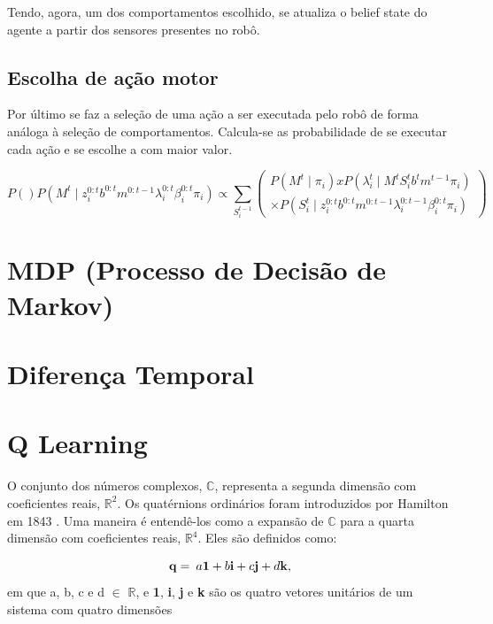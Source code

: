 Tendo, agora, um dos comportamentos escolhido, se atualiza o belief state do agente a partir dos sensores presentes no robô.



\subsection{Escolha de ação motor}

Por último se faz a seleção de uma ação a ser executada pelo robô de forma análoga à seleção de comportamentos. Calcula-se as probabilidade de se executar cada ação  e se escolhe a com maior valor.

\begin{equation}
    P \left( \right)
    P \left( M^t \mid z_i^{0: t} b^{0: t} m^{0: t-1} \lambda_i^{0: t} \beta_i^{0: t} \pi_i \right) \propto \sum\limits_{S_i^{t-1}}
        \left(
            \begin{array}{l}
                P \left( M^t \mid \pi_i \right) x   P \left( \lambda_i^t \mid M^t S_i^t b^t m^{t-1} \pi_i \right)\\
                \times P \left( S_i^t \mid z_i^{0: t} b^{0: t} m^{0: t-1} \lambda_i^{0: t-1} \beta_i^{0: t} \pi_i \right)
            \end{array}
        \right)
\end{equation}


\section{MDP (Processo de Decisão de Markov)}

\section{Diferença Temporal}

\section{Q Learning}

O conjunto dos números complexos, $\mathbb{C}$, representa a segunda
dimensão com coeficientes reais, $\mathbb{R}^{2}$. Os quatérnions
ordinários foram introduzidos por Hamilton em 1843 \cite{book:hamilton:1969}.
Uma maneira é entendê-los como a expansão de $\mathbb{C}$ para a
quarta dimensão com coeficientes reais, $\mathbb{R}^{4}$. Eles são
definidos como:

\begin{equation}
\mathbf{q}=\: a\mathbf{1\:+\:}b\mathbf{i\:+\:}c\mathbf{j\:+\:}d\mathbf{k},\label{eq:DefinicaoQuaternion}
\end{equation}
em que a, b, c e d $\in$ $\mathbb{R}$, e \textbf{1},\textbf{ i},\textbf{
j }e\textbf{ k} são os quatro vetores unitários de um sistema com
quatro dimensões

